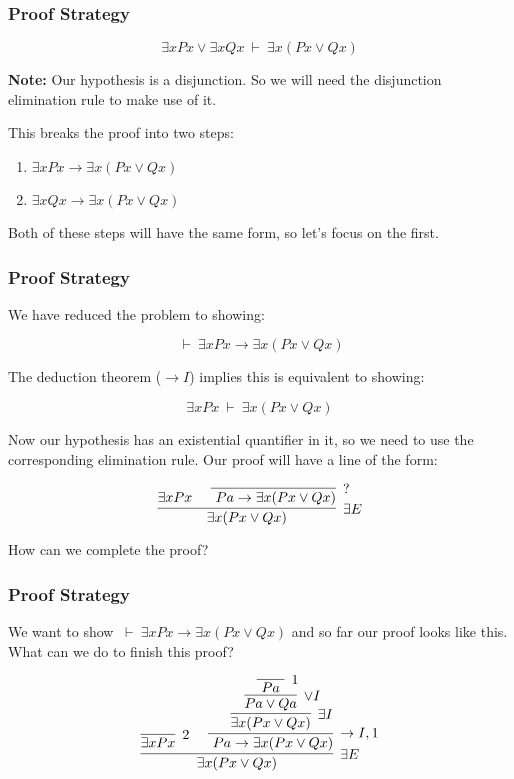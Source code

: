 \documentclass{beamer}
\theoremstyle{indentDefn} \newtheorem{defn}[]{Definition}
\begin{document}
\begin{frame}
	\frametitle{Proof Strategy}
	
	$$\exists x Px \lor \exists x Qx \ \vdash \ \exists x (Px \lor Qx)$$

	{\bf Note:} Our hypothesis is a disjunction. So we will need the disjunction elimination rule to make use of it. 
	
	\vspace{2cm}
	
	This breaks the proof into two steps: 
	
	\begin{center}
	\begin{enumerate}
		\item $\exists x Px \rightarrow \exists x (Px \lor Qx)$
		\item $\exists x Qx \rightarrow \exists x (Px \lor Qx)$		
	\end{enumerate}
	\end{center}
	
	Both of these steps will have the same form, so let's focus on the first.		
\end{frame}

\begin{frame}
	\frametitle{Proof Strategy}

	We have reduced the problem to showing:	

	 $$ \ \vdash \ \exists x Px \rightarrow \exists x (Px \lor Qx)$$
	
	\pause
	
	The deduction theorem ($\rightarrow I$) implies this is equivalent to showing:
	
	$$\exists x Px \ \vdash \  \exists x (Px \lor Qx)$$
	
	\pause
	
	Now our hypothesis has an existential quantifier in it, so we need to use the corresponding elimination rule. Our proof will have a line of the form: 
	
	\vspace{0.7cm}
	
	$$ \infer[\exists E]{\exists x (Px \lor Qx)}{\exists x Px \ & \infer[?]{\ Pa \rightarrow \exists x (Px \lor Qx)}{} } $$

	How can we complete the proof? 
		
\end{frame}

\begin{frame}
	\frametitle{Proof Strategy}
	
		We want to show $ \ \vdash \ \exists x Px \rightarrow \exists x (Px \lor Qx)$ and so far our proof looks like this. What can we do to finish this proof?
	
	$$ \infer[\exists E]{\exists x (Px \lor Qx)}{\infer[2]{\exists x Px}{} \ & \infer[\rightarrow I,1]{\ Pa \rightarrow \exists x (Px \lor Qx)}{\infer[\exists I]{\exists x (Px \lor Qx)}
			{\infer[\lor I]{Pa \lor Qa}
				{\infer[1]{ \ Pa \ }{}}}}} $$
	
	\vspace{3cm}		
	
\end{frame}
\end{document}

